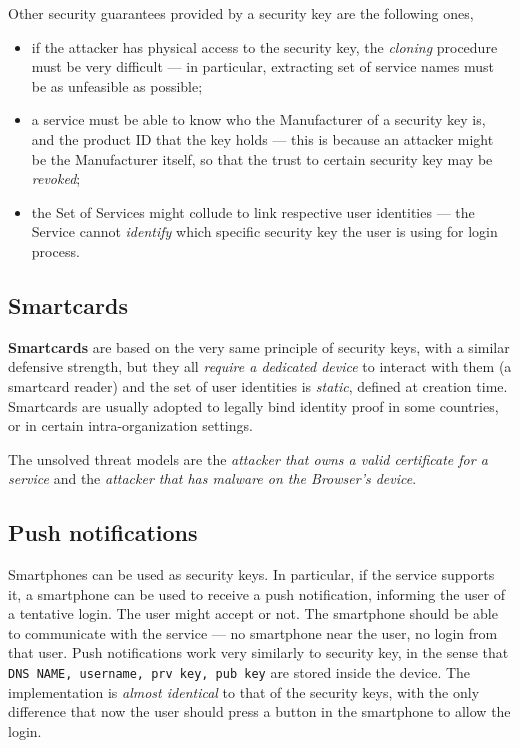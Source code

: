 \documentclass[10pt]{extreport}
\begin{document}
Other security guarantees provided by a security key are the following ones,
\begin{itemize}
    \item if the attacker has physical access to the security key, the
        \emph{cloning} procedure must be very difficult --- in particular,
        extracting set of service names must be as unfeasible as possible;
    \item a service must be able to know who the Manufacturer of a security key
        is, and the product ID that the key holds --- this is because an
        attacker might be the Manufacturer itself, so that the trust to certain
        security key may be \emph{revoked};
    \item the Set of Services might collude to link respective user identities
        --- the Service cannot \emph{identify} which specific security key the
        user is using for login process.
\end{itemize}

\subsection{Smartcards}

\textbf{Smartcards} are based on the very same principle of security keys, with
a similar defensive strength, but they all \emph{require a dedicated device} to
interact with them (a smartcard reader) and the set of user identities is
\emph{static}, defined at creation time. Smartcards are usually adopted to
legally bind identity proof in some countries, or in certain
intra\--organization settings.


The unsolved threat models are the \emph{attacker that owns a valid certificate
for a service} and the \emph{attacker that has malware on the Browser's
device}.

\subsection{Push notifications}

Smartphones can be used as security keys. In particular, if the service
supports it, a smartphone can be used to receive a push notification, informing
the user of a tentative login. The user might accept or not. The smartphone
should be able to communicate with the service --- no smartphone near the user,
no login from that user. Push notifications work very similarly to security
key, in the sense that \texttt{DNS NAME, username, prv key, pub key} are stored
inside the device. The implementation is \emph{almost identical} to that of the
security keys, with the only difference that now the user should press a button
in the smartphone to allow the login.
\end{document}
